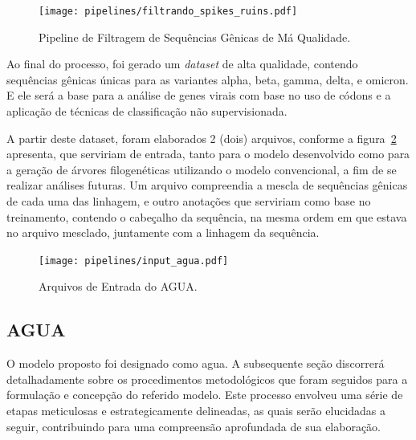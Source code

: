 \begin{enumerate}
        \begin{figure}[htb]
          \centering
          \caption{Pipeline de Filtragem de Sequências Gênicas de Má Qualidade.}
          \texttt{[image: pipelines/filtrando\_spikes\_ruins.pdf]}
          ~\label{fig:spikesRuins}
        \end{figure}
\end{enumerate}

Ao final do processo, foi gerado um \textit{dataset} de alta qualidade, contendo sequências gênicas únicas para as variantes alpha, beta, gamma, delta, e omicron. E ele será a base para a análise de genes virais com base no uso de códons e a aplicação de técnicas de classificação não supervisionada.

A partir deste dataset, foram elaborados 2 (dois) arquivos, conforme a figura~\ref{fig:inputAgua} apresenta, que serviriam de entrada, tanto para o modelo desenvolvido como para a geração de árvores filogenéticas utilizando o modelo convencional, a fim de se realizar análises futuras. Um arquivo compreendia a mescla de sequências gênicas de cada uma das linhagem, e outro anotações que serviriam como base no treinamento, contendo o cabeçalho da sequência, na mesma ordem em que estava no arquivo mesclado, juntamente com a linhagem da sequência.

\begin{figure}[htb]
  \centering
  \caption{Arquivos de Entrada do AGUA.}
  \texttt{[image: pipelines/input\_agua.pdf]}
  ~\label{fig:inputAgua}
\end{figure}

\subsection{AGUA}
O modelo proposto foi designado como \gls{agua}. A subsequente seção discorrerá detalhadamente sobre os procedimentos metodológicos que foram seguidos para a formulação e concepção do referido modelo. Este processo envolveu uma série de etapas meticulosas e estrategicamente delineadas, as quais serão elucidadas a seguir, contribuindo para uma compreensão aprofundada de sua elaboração.


